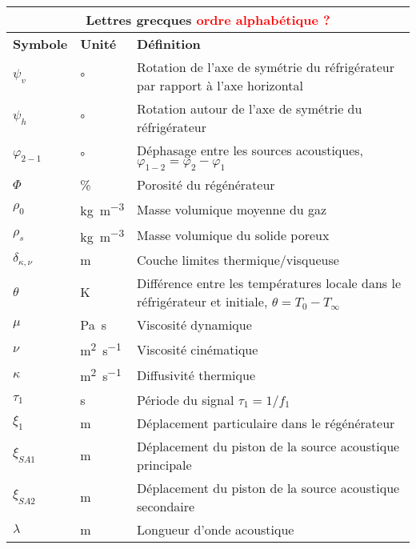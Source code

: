 \begin{center}
    \begin{longtable}{p{} p{} p{}}
        \multicolumn{3}{c}{Lettres grecques \textcolor{red}{ordre alphabétique ?}}  \\\hline
        \textbf{Symbole} & \textbf{Unité} & \textbf{Définition} \\\hline\hline
        $\psi_v$ & \unit{\degree} & Rotation de l'axe de symétrie du réfrigérateur par rapport à l'axe horizontal\\
        $\psi_h$ & \unit{\degree} & Rotation autour de l'axe de symétrie du réfrigérateur \\
        $\varphi_{2-1}$ & \unit{\degree} & Déphasage entre les sources acoustiques, $\varphi_{1-2} = \varphi_2 - \varphi_1$\\
        $\Phi$ & \unit{\percent} & Porosité du régénérateur \\
        $\rho_0$ & \unit{\kilo\gram\per\cubic\meter} & Masse volumique moyenne du gaz \\
        $\rho_{s}$ & \unit{\kilo\gram\per\cubic\meter} & Masse volumique du solide poreux\\
        $\delta_{\kappa,\nu}$ & \unit{\meter} & Couche limites thermique/visqueuse \\
        $\theta$ & \unit{\kelvin} & Différence entre les températures locale dans le réfrigérateur et initiale, $\theta=T_0-T_\infty$\\
        $\mu$ & \unit{\pascal\second} & Viscosité dynamique \\
        $\nu$ & \unit{\square\meter\per\second} & Viscosité cinématique \\
        $\kappa$ & \unit{\square\meter\per\second} & Diffusivité thermique \\
        $\tau_1$ & \unit{\second} & Période du signal $\tau_1 = 1/f_1$ \\
        $\xi_1$ & \unit{\meter} & Déplacement particulaire dans le régénérateur \\
        $\xi_{SA1}$ & \unit{\meter} & Déplacement du piston de la source acoustique principale \\
        $\xi_{SA2}$ & \unit{\meter} & Déplacement du piston de la source acoustique secondaire \\
        $\lambda$ & \unit{\meter} & Longueur d'onde acoustique \\\hline
    \end{longtable}

\bigskip


\end{center}
